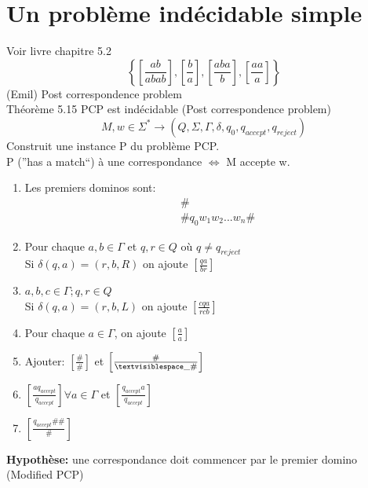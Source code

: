 \documentclass[a4paper,12pt]{article}
\begin{document}
\section{Un problème indécidable simple}
  Voir livre chapitre 5.2\\
  $$\left\{\left[\frac{ab}{abab}\right], \left[\frac{b}{a}\right], \left[\frac{aba}{b}\right], \left[\frac{aa}{a}\right]\right\}$$
  (Emil) Post correspondence problem\\
  Théorème 5.15 PCP est indécidable (Post correspondence problem)\\

  $$M, w \in \Sigma^* \rightarrow (Q, \Sigma, \Gamma, \delta, q_0, q_{accept}, q_{reject})$$
  Construit une instance P du problème PCP.\\
  P (''has a match``) à une correspondance $\Leftrightarrow$ M accepte w.

  \begin{enumerate}
    \item Les premiers dominos sont:
      \begin{align*}
	&\#\\
	&\# q_0 w_1 w_2 ... w_n \#
      \end{align*}
    \item Pour chaque $a, b \in \Gamma$ et $q, r \in Q$ où $q \neq q_{reject}$\\
      Si $\delta(q, a) = (r, b, R)$ on ajoute $\left[\frac{qa}{br}\right]$
    \item $a, b, c \in \Gamma; q, r \in Q$\\
      Si $\delta(q, a) = (r, b, L)$ on ajoute $\left[\frac{cqa}{rcb}\right]$
    \item Pour chaque $a \in \Gamma$, on ajoute $\left[\frac{a}{a}\right]$
    \item Ajouter: $\left[\frac{\#}{\#}\right]$ et $\left[\frac{\#}{\textvisiblespace \_ \#}\right]$
    \item $\left[\frac{a q_{accept}}{q_{accept}}\right] \forall a \in \Gamma$ et $\left[\frac{q_{accept} a}{q_{accept}}\right]$
    \item $\left[\frac{q_{accept} \# \#}{\#}\right]$
  \end{enumerate}

  \textbf{Hypothèse:} une correspondance doit commencer par le premier domino (Modified PCP)\\
\end{document}
